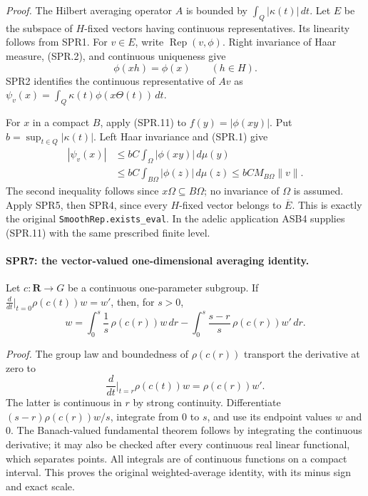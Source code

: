 \emph{Proof.}
The Hilbert averaging operator \(A\) is bounded by
\(\int_Q|\kappa(t)|\,dt\).
Let \(E\) be the subspace of \(H\)-fixed vectors having continuous
representatives.  Its linearity follows from SPR1.
For \(v\in E\), write \(\operatorname{Rep}(v,\phi)\).
Right invariance of Haar measure, (SPR.2), and continuous
uniqueness give
\[
                         \phi(xh)=\phi(x)\qquad(h\in H).
 \tag{SPR.13}
\]
SPR2 identifies the continuous representative of \(Av\) as
\(\psi_v(x)=\int_Q\kappa(t)\phi(x\Theta(t))\,dt\).

For \(x\) in a compact \(B\), apply (SPR.11) to
\(f(y)=|\phi(xy)|\).  Put
\(b=\sup_{t\in Q}|\kappa(t)|\).  Left Haar invariance and (SPR.1)
give
\[
\begin{split}
 |\psi_v(x)|
 &\le bC\int_\Omega|\phi(xy)|\,d\mu(y)\\
 &\le bC\int_{B\Omega}|\phi(z)|\,d\mu(z)
 \le bC M_{B\Omega}\|v\|.
\end{split}
\tag{SPR.14}
\]
The second inequality follows since \(x\Omega\subseteq B\Omega\);
no invariance of \(\Omega\) is assumed.
Apply SPR5, then SPR4, since every \(H\)-fixed vector belongs to
\(\overline E\).  This is exactly the original
\texttt{SmoothRep.\allowbreak exists\_\allowbreak eval}.  In the adelic application ASB4
supplies (SPR.11) with the same prescribed finite level.

\paragraph{SPR7: the vector-valued one-dimensional averaging identity.}
\label{claim:SPR7}
Let \(c:\mathbf R\to G\) be a continuous one-parameter subgroup.
If
\(\frac{d}{dt}|_{t=0}\rho(c(t))w=w'\), then, for \(s>0\),
\[
 w=\int_0^s\frac1s\,\rho(c(r))w\,dr
       -\int_0^s\frac{s-r}{s}\,\rho(c(r))w'\,dr.
 \tag{SPR.15}
\]

\emph{Proof.}
The group law and boundedness of \(\rho(c(r))\) transport the
derivative at zero to
\[
 \frac{d}{dt}\bigg|_{t=r}\rho(c(t))w=\rho(c(r))w'.
\]
The latter is continuous in \(r\) by strong continuity.
Differentiate
\((s-r)\rho(c(r))w/s\), integrate from \(0\) to \(s\), and use
its endpoint values \(w\) and \(0\).
The Banach-valued fundamental theorem follows by integrating
the continuous derivative; it may also be checked after every
continuous real linear functional, which separates points.
All integrals are of continuous functions on a compact interval.
This proves the original weighted-average identity, with its
minus sign and exact scale.


